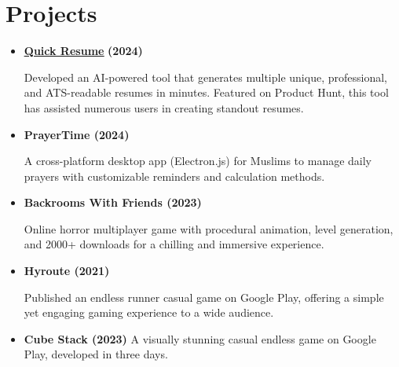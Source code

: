 \documentclass[letterpaper,11pt]{article}
\newcommand{\resumeItem}[1]{
  \item\small{
    {#1 \vspace{-2pt}}
  }
}
\newcommand{\resumeSubItem}[1]{\resumeItem{#1}\vspace{-4pt}}
\newcommand{\resumeSubHeadingListStart}{\begin{itemize}[leftmargin=0.15in, label={}]}
\newcommand{\resumeSubHeadingListEnd}{\end{itemize}}
\begin{document}
\section{Projects}
  \resumeSubHeadingListStart
  \resumeSubItem{ \href{https://quickresume.co/?ref=res}{\underline{\textbf{Quick Resume}}}{\textbf{ (2024)}}}
    \begin{flushleft}
      {Developed an AI-powered tool that generates multiple unique, professional, and ATS-readable resumes in minutes. Featured on Product Hunt, this tool has assisted numerous users in creating standout resumes.}
       \end{flushleft}
  \resumeSubItem{\textbf{PrayerTime (2024)}}
    \begin{flushleft}
    A cross-platform desktop app (Electron.js) for Muslims to manage daily prayers with customizable reminders and calculation methods.
    \end{flushleft}
    \resumeSubItem{\textbf{Backrooms With Friends (2023)}}
    \begin{flushleft}
    Online horror multiplayer game with procedural animation, level generation, and 2000+ downloads for a chilling and immersive experience.
    \end{flushleft}

    \resumeSubItem{\textbf{Hyroute (2021)}}
    \begin{flushleft}
      {Published an endless runner casual game on Google Play, offering a simple yet engaging gaming
experience to a wide audience.}
      \end{flushleft}
    \resumeSubItem{\textbf{Cube Stack (2023)}}
      {A visually stunning casual endless game on Google Play, developed in three days.}


  \resumeSubHeadingListEnd

%


\end{document}
